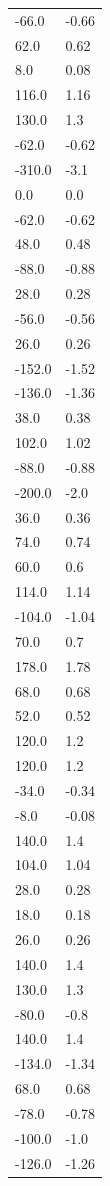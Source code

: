 \begin{longtable}{ll}
-66.0 & -0.66 \\
62.0 & 0.62 \\
8.0 & 0.08 \\
116.0 & 1.16 \\
130.0 & 1.3 \\
-62.0 & -0.62 \\
-310.0 & -3.1 \\
0.0 & 0.0 \\
-62.0 & -0.62 \\
48.0 & 0.48 \\
-88.0 & -0.88 \\
28.0 & 0.28 \\
-56.0 & -0.56 \\
26.0 & 0.26 \\
-152.0 & -1.52 \\
-136.0 & -1.36 \\
38.0 & 0.38 \\
102.0 & 1.02 \\
-88.0 & -0.88 \\
-200.0 & -2.0 \\
36.0 & 0.36 \\
74.0 & 0.74 \\
60.0 & 0.6 \\
114.0 & 1.14 \\
-104.0 & -1.04 \\
70.0 & 0.7 \\
178.0 & 1.78 \\
68.0 & 0.68 \\
52.0 & 0.52 \\
120.0 & 1.2 \\
120.0 & 1.2 \\
-34.0 & -0.34 \\
-8.0 & -0.08 \\
140.0 & 1.4 \\
104.0 & 1.04 \\
28.0 & 0.28 \\
18.0 & 0.18 \\
26.0 & 0.26 \\
140.0 & 1.4 \\
130.0 & 1.3 \\
-80.0 & -0.8 \\
140.0 & 1.4 \\
-134.0 & -1.34 \\
68.0 & 0.68 \\
-78.0 & -0.78 \\
-100.0 & -1.0 \\
-126.0 & -1.26 \\

\end{longtable}
